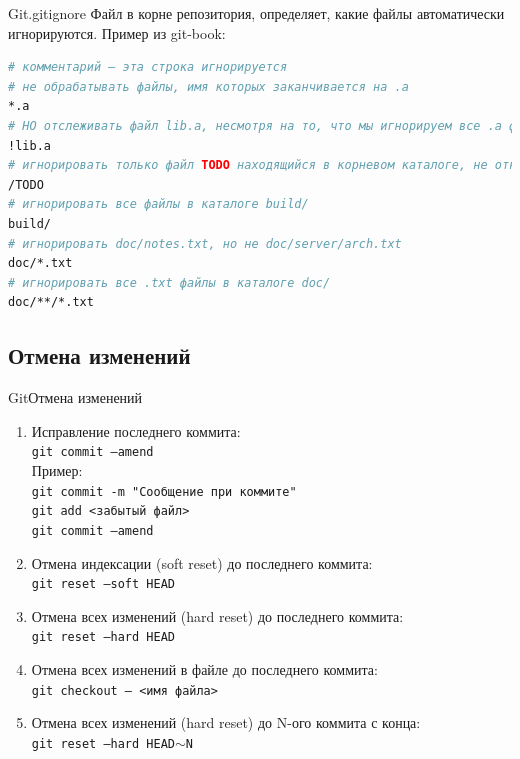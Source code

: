 \documentclass[10pt]{beamer}
\begin{document}
\begin{frame}[fragile]{Git}{.gitignore}
Файл в корне репозитория, определяет, какие файлы автоматически игнорируются.
Пример из git-book:
\begin{lstlisting}[language=bash]
# комментарий — эта строка игнорируется
# не обрабатывать файлы, имя которых заканчивается на .a
*.a
# НО отслеживать файл lib.a, несмотря на то, что мы игнорируем все .a файлы с помощью предыдущего правила
!lib.a
# игнорировать только файл TODO находящийся в корневом каталоге, не относится к файлам вида subdir/TODO
/TODO
# игнорировать все файлы в каталоге build/
build/
# игнорировать doc/notes.txt, но не doc/server/arch.txt
doc/*.txt
# игнорировать все .txt файлы в каталоге doc/
doc/**/*.txt
\end{lstlisting}
\end{frame}

\subsection{Отмена изменений}
\begin{frame}[fragile]{Git}{Отмена изменений}
\begin{enumerate}
\item Исправление последнего коммита:\\
\texttt{git commit --amend}\\
Пример:\\
\texttt{git commit -m "Сообщение при коммите"}\\
\texttt{git add <забытый файл>}\\
\texttt{git commit ---amend}\\

\item Отмена индексации (soft reset) до последнего коммита:\\
\texttt{git reset ---soft HEAD}\\

\item Отмена всех изменений (hard reset) до последнего коммита:\\
\texttt{git reset ---hard HEAD}\\

\item Отмена всех изменений в файле до последнего коммита:\\
\texttt{git checkout --- <имя файла> }\\

\item Отмена всех изменений (hard reset) до N-ого коммита с конца:\\
\texttt{git reset ---hard HEAD$\sim$N}\\
\end{enumerate}
\end{frame}
\end{document}
